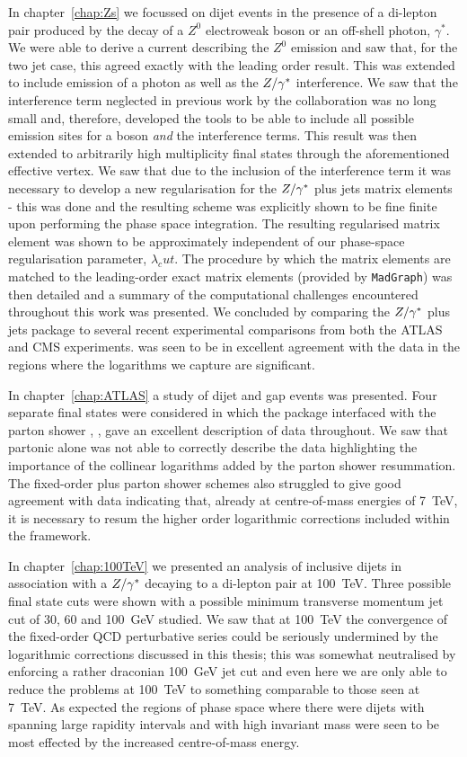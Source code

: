 In chapter~\ref{chap:Zs} we focussed on dijet events in the presence of a di-lepton pair produced by
the decay of a $Z^0$ electroweak boson or an off-shell photon, $\gamma^*$.  We were able to derive a
current describing the $Z^0$ emission and saw that, for the two jet case, this agreed exactly with the
leading order result.  This was extended to include emission of a photon as well as the $Z/\gamma^*$ interference.
We saw that the interference term neglected in previous work by the \hej collaboration was no long small
and, therefore, developed the tools to be able to include all possible emission sites for a boson \emph{and}
the interference terms.  This result was then extended to arbitrarily high multiplicity final states through
the aforementioned effective vertex.  We saw that due to the inclusion of the interference term it was necessary
to develop a new regularisation for the $Z/\gamma^*$ plus jets matrix elements - this was done and the resulting
scheme was explicitly shown to be fine finite upon performing the phase space integration.  The resulting
regularised matrix element was shown to be approximately independent of our phase-space regularisation
parameter, $\lambda_cut$.  The procedure by which the \HEJ matrix elements are matched to the leading-order
exact matrix elements (provided by \texttt{MadGraph}) was then detailed and a summary of the computational
challenges encountered throughout this work was presented.  We concluded by comparing the \HEJ $Z/\gamma^*$ plus jets
package to several recent experimental comparisons from both the ATLAS and CMS experiments.  \HEJ was seen to
be in excellent agreement with the data in the regions where the logarithms we capture are significant.

In chapter~\ref{chap:ATLAS} a study of dijet and gap events was presented.  Four separate final states
were considered in which the \HEJ package interfaced with the parton shower \ARIADNE, \HEJA, gave an
excellent description of data throughout.  We saw that partonic \HEJ alone was not able to correctly
describe the data highlighting the importance of the collinear logarithms added by the parton shower
resummation.  The fixed-order plus parton shower schemes also struggled to give good agreement with
data indicating that, already at centre-of-mass energies of 7~TeV, it is necessary to resum the higher
order logarithmic corrections included within the \hej framework.

In chapter~\ref{chap:100TeV} we presented an analysis of inclusive dijets in association with a $Z/\gamma^*$
decaying to a di-lepton pair at 100~TeV.  Three possible final state cuts were shown with a possible
minimum transverse momentum jet cut of 30, 60 and 100~GeV studied.  We saw that at 100~TeV the
convergence of the fixed-order QCD perturbative series could be seriously undermined by the logarithmic
corrections discussed in this thesis; this was somewhat neutralised by enforcing a rather draconian
100~GeV jet cut and even here we are only able to reduce the problems at 100~TeV to something comparable
to those seen at 7~TeV.  As expected the regions of phase space where there were dijets with spanning
large rapidity intervals and with high invariant mass were seen to be most effected by the increased
centre-of-mass energy.

